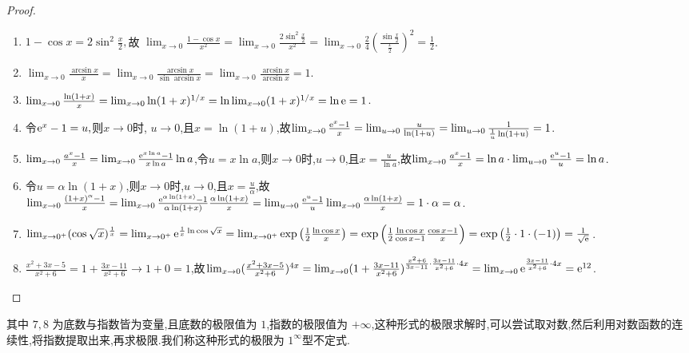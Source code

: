 \begin{proof}
    \begin{enumerate}
        \item $1- \cos x = 2 \sin^2 \frac x2 ,$故 $\lim_{x \to 0} \frac{1 - \cos x}{x^2} = \lim_{x \to 0} \frac{2 \sin^2 \frac x2}{x^2} = \lim_{x \to 0} \frac{2}{4} \left( \frac{\sin \frac x2}{\frac x2} \right)^2 = \frac 12$.
        \item $\lim_{x \to 0} \frac{\arcsin x}{x} = \lim_{x \to 0} \frac{\arcsin x}{\sin \arcsin x} = \lim_{x \to 0} \frac{\arcsin x}{\arcsin x} = 1$.
        \item $\lim_{x \to 0} \frac{\ln(1+x)}{x} = \lim_{x \to 0} \ln (1+x)^{1/x} = \ln \lim_{x \to 0} (1+x)^{1/x} = \ln \mathrm{e} = 1$.
        \item 令$\mathrm{e}^x - 1 = u,$则$x \to 0 $时, $u \to 0$,且$x = \ln(1+u)$,故$\lim_{x \to 0} \frac{\mathrm{e}^x - 1}{x} = \lim_{u \to 0} \frac{u}{\ln(1+u)} = \lim_{u \to 0} \frac{1}{\frac{1}{u} \ln(1+u)} = 1$.
        \item $\lim_{x \to 0} \frac{a^x - 1}{x} = \lim_{x \to 0} \frac{\mathrm{e}^{x \ln a} - 1}{x \ln a} \ln a$,令$u = x \ln a$,则$x \to 0$时,$u \to 0$,且$x = \frac{u}{\ln a}$,故$\lim_{x \to 0} \frac{a^x - 1}{x} = \ln a \cdot \lim_{u \to 0} \frac{\mathrm{e}^u - 1}{u} = \ln a$.
        \item 令$u = \alpha \ln(1 + x)$,则$x \to 0$时,$u \to 0$,且$x = \frac{u}{\alpha}$,故$\lim_{x \to 0} \frac{(1+x)^\alpha - 1}{x} = \lim_{x \to 0 } \frac{\mathrm{e}^{\alpha \ln(1+x)} - 1}{\alpha \ln(1+x)} \frac{\alpha \ln(1+x)}{x} = \lim_{u \to 0} \frac{\mathrm{e}^u - 1}{u} \lim_{x \to 0} \frac{\alpha \ln(1+x)}{x} = 1 \cdot \alpha = \alpha$.
        \item $\lim_{x \to 0^+} (\cos \sqrt{x})^{\frac 1x} = \lim_{x \to 0^+} \mathrm{e}^{\frac 1x \ln \cos \sqrt{x}} = \lim_{x \to 0^+} \exp\left( {\frac12 \frac{\ln \cos x}{x}} \right)= \exp \left({\frac12 \frac{\ln \cos x}{\cos x - 1} \frac{\cos x - 1}{x}} \right) = \exp\left( {\frac12 \cdot 1 \cdot (-1)} \right) = \frac 1{\sqrt{\mathrm{e}}}$.
        \item $\frac{x^2 +3x- 5}{x^2+6} = 1 + \frac{3x-11}{x^2+6} \to 1 + 0 = 1$,故$\lim_{x \to 0} (\frac{x^2 +3x- 5}{x^2+6})^{4x} = \lim_{x \to 0} (1 + \frac{3x-11}{x^2+6})^{\frac{x^2+6}{3x-11} \cdot \frac{3x-11}{x^2+6} \cdot 4x} = \lim_{x \to 0} \mathrm{e}^{\frac{3x-11}{x^2+6} \cdot 4x} = \mathrm{e}^{12}$.
    \end{enumerate}
\end{proof}

其中 $7,8$ 为底数与指数皆为变量,且底数的极限值为 $1$,指数的极限值为 $+\infty$,这种形式的极限求解时,可以尝试取对数,然后利用对数函数的连续性,将指数提取出来,再求极限.我们称这种形式的极限为 $1^{\infty}$型不定式.

